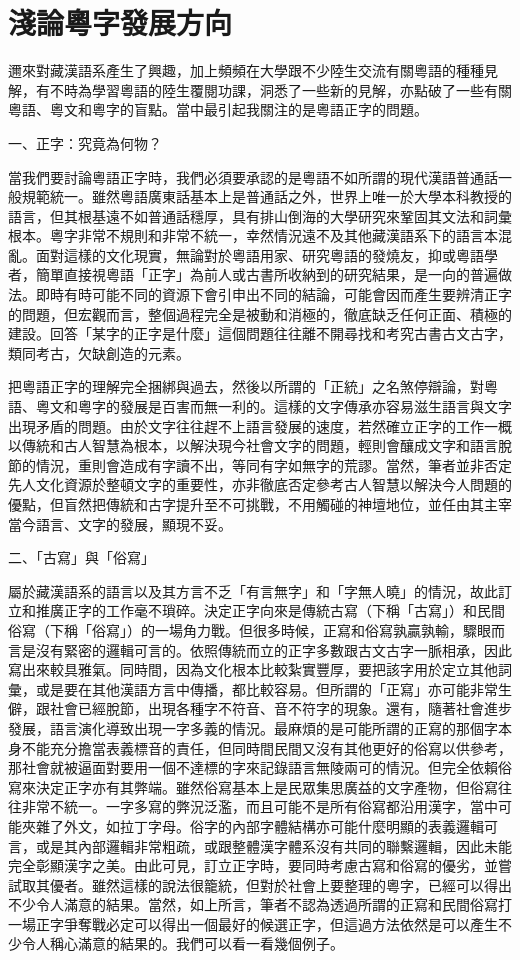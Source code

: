 \documentclass[a5paper, 10pt, openany]{book} %
\begin{document}
\chapter{淺論粵字發展方向}

邇來對藏漢語系產生了興趣，加上頻頻在大學跟不少陸生交流有關粵語的種種見解，有不時為學習粵語的陸生覆閱功課，洞悉了一些新的見解，亦點破了一些有關粵語、粵文和粵字的盲點。當中最引起我關注的是粵語正字的問題。

一、正字：究竟為何物？

當我們要討論粵語正字時，我們必須要承認的是粵語不如所謂的現代漢語普通話一般規範統一。雖然粵語廣東話基本上是普通話之外，世界上唯一於大學本科教授的語言，但其根基遠不如普通話穩厚，具有排山倒海的大學研究來鞏固其文法和詞彙根本。粵字非常不規則和非常不統一，幸然情況遠不及其他藏漢語系下的語言本混亂。面對這樣的文化現實，無論對於粵語用家、研究粵語的發燒友，抑或粵語學者，簡單直接視粵語「正字」為前人或古書所收納到的研究結果，是一向的普遍做法。即時有時可能不同的資源下會引申出不同的結論，可能會因而產生要辨清正字的問題，但宏觀而言，整個過程完全是被動和消極的，徹底缺乏任何正面、積極的建設。回答「某字的正字是什麼」這個問題往往離不開尋找和考究古書古文古字，類同考古，欠缺創造的元素。

把粵語正字的理解完全捆綁與過去，然後以所謂的「正統」之名煞停辯論，對粵語、粵文和粵字的發展是百害而無一利的。這樣的文字傳承亦容易滋生語言與文字出現矛盾的問題。由於文字往往趕不上語言發展的速度，若然確立正字的工作一概以傳統和古人智慧為根本，以解決現今社會文字的問題，輕則會釀成文字和語言脫節的情況，重則會造成有字讀不出，等同有字如無字的荒謬。當然，筆者並非否定先人文化資源於整頓文字的重要性，亦非徹底否定參考古人智慧以解決今人問題的優點，但盲然把傳統和古字提升至不可挑戰，不用觸碰的神壇地位，並任由其主宰當今語言、文字的發展，顯現不妥。

二、「古寫」與「俗寫」

屬於藏漢語系的語言以及其方言不乏「有言無字」和「字無人曉」的情況，故此訂立和推廣正字的工作毫不瑣碎。決定正字向來是傳統古寫（下稱「古寫」）和民間俗寫（下稱「俗寫」）的一場角力戰。但很多時候，正寫和俗寫孰贏孰輸，驟眼而言是沒有緊密的邏輯可言的。依照傳統而立的正字多數跟古文古字一脈相承，因此寫出來較具雅氣。同時間，因為文化根本比較紮實豐厚，要把該字用於定立其他詞彙，或是要在其他漢語方言中傳播，都比較容易。但所謂的「正寫」亦可能非常生僻，跟社會已經脫節，出現各種字不符音、音不符字的現象。還有，隨著社會進步發展，語言演化導致出現一字多義的情況。最麻煩的是可能所謂的正寫的那個字本身不能充分擔當表義標音的責任，但同時間民間又沒有其他更好的俗寫以供參考，那社會就被逼面對要用一個不達標的字來記錄語言無陵兩可的情況。但完全依賴俗寫來決定正字亦有其弊端。雖然俗寫基本上是民眾集思廣益的文字產物，但俗寫往往非常不統一。一字多寫的弊況泛濫，而且可能不是所有俗寫都沿用漢字，當中可能夾雜了外文，如拉丁字母。俗字的內部字體結構亦可能什麼明顯的表義邏輯可言，或是其內部邏輯非常粗疏，或跟整體漢字體系沒有共同的聯繫邏輯，因此未能完全彰顯漢字之美。由此可見，訂立正字時，要同時考慮古寫和俗寫的優劣，並嘗試取其優者。雖然這樣的說法很籠統，但對於社會上要整理的粵字，已經可以得出不少令人滿意的結果。當然，如上所言，筆者不認為透過所謂的正寫和民間俗寫打一場正字爭奪戰必定可以得出一個最好的候選正字，但這過方法依然是可以產生不少令人稱心滿意的結果的。我們可以看一看幾個例子。
\end{document}
